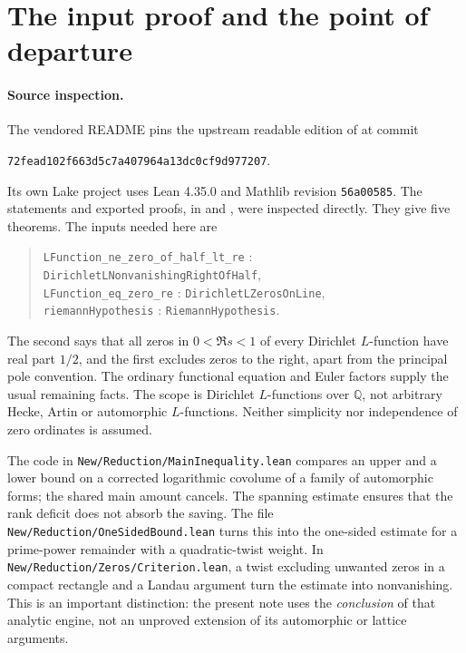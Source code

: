 \documentclass[11pt]{article}
\theoremstyle{remark}\newtheorem{remark}[theorem]{Remark}
\newcommand{\code}[1]{\texttt{#1}}
\begin{document}
\section{The input proof and the point of departure}
\paragraph{Source inspection.} The vendored README pins the upstream readable edition of \cite{sernau} at commit
\begin{center}\small\code{72fead102f663d5c7a407964a13dc0cf9d977207}.\end{center}
Its own Lake project uses Lean 4.35.0 and Mathlib revision \code{56a00585}. The statements and exported proofs, in  and , were inspected directly. They give five theorems. The inputs needed here are
\begin{quote}\small
\code{LFunction\_ne\_zero\_of\_half\_lt\_re} : \code{DirichletLNonvanishingRightOfHalf},\\
\code{LFunction\_eq\_zero\_re} : \code{DirichletLZerosOnLine},\\
\code{riemannHypothesis} : \code{RiemannHypothesis}.
\end{quote}
The second says that all zeros in $0<\Re s<1$ of every Dirichlet $L$-function have real part $1/2$, and the first excludes zeros to the right, apart from the principal pole convention. The ordinary functional equation and Euler factors supply the usual remaining facts. The scope is Dirichlet $L$-functions over $\mathbb Q$, not arbitrary Hecke, Artin or automorphic $L$-functions. Neither simplicity nor independence of zero ordinates is assumed.

The code in \code{New/Reduction/MainInequality.lean} compares an upper and a lower bound on a corrected logarithmic covolume of a family of automorphic forms; the shared main amount cancels. The spanning estimate ensures that the rank deficit does not absorb the saving. The file \code{New/Reduction/OneSidedBound.lean} turns this into the one-sided estimate for a prime-power remainder with a quadratic-twist weight. In \code{New/Reduction/Zeros/Criterion.lean}, a twist excluding unwanted zeros in a compact rectangle and a Landau argument turn the estimate into nonvanishing. This is an important distinction: the present note uses the \emph{conclusion} of that analytic engine, not an unproved extension of its automorphic or lattice arguments.
\end{document}
